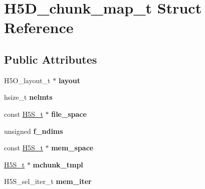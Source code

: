 \hypertarget{struct_h5_d__chunk__map__t}{}\section{H5\+D\+\_\+chunk\+\_\+map\+\_\+t Struct Reference}
\label{struct_h5_d__chunk__map__t}
\subsection*{Public Attributes}
\begin{DoxyCompactItemize}
\item 
\mbox{\label{struct_h5_d__chunk__map__t_a55718541fddb0f19f550ab475b38c46a}} 
H5\+O\+\_\+layout\+\_\+t $\ast$ {\bfseries layout}
\item 
\mbox{\label{struct_h5_d__chunk__map__t_a0e634974218fad5d29705422db8fe088}} 
hsize\+\_\+t {\bfseries nelmts}
\item 
\mbox{\label{struct_h5_d__chunk__map__t_aad91299e12c5a9a4b9972102de2293aa}} 
const \hyperlink{struct_h5_s__t}{H5\+S\+\_\+t} $\ast$ {\bfseries file\+\_\+space}
\item 
\mbox{\label{struct_h5_d__chunk__map__t_ab067185e05b0227e2b6ce13d143dbfac}} 
unsigned {\bfseries f\+\_\+ndims}
\item 
\mbox{\label{struct_h5_d__chunk__map__t_a16cccc20e979c943c9dd622c68b211e5}} 
const \hyperlink{struct_h5_s__t}{H5\+S\+\_\+t} $\ast$ {\bfseries mem\+\_\+space}
\item 
\mbox{\label{struct_h5_d__chunk__map__t_af530dee61834e623daa0a82d9978c68c}} 
\hyperlink{struct_h5_s__t}{H5\+S\+\_\+t} $\ast$ {\bfseries mchunk\+\_\+tmpl}
\item 
\mbox{\label{struct_h5_d__chunk__map__t_a20b383ab54a976defb4bba7462adfea3}} 
H5\+S\+\_\+sel\+\_\+iter\+\_\+t {\bfseries mem\+\_\+iter}
\item 
\mbox{\label{struct_h5_d__chunk__map__t_ad5ce4833aeb84ddd50259875e824b3e8}} 

\end{DoxyCompactItemize}
